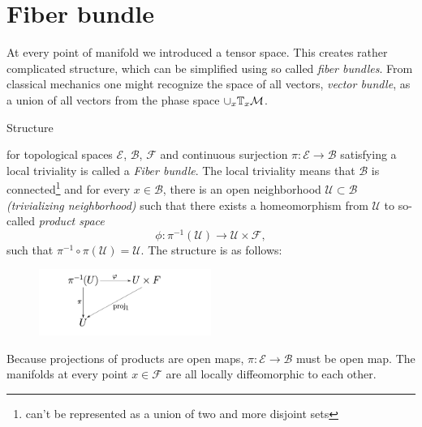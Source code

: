 \section{Fiber bundle}
\label{sec:bundleDef}
At every point of manifold we introduced a tensor space. This creates rather complicated structure, which can be simplified using so called \emph{fiber bundles}. From classical mechanics one might recognize the space of all vectors, \emph{vector bundle}, as a union of all vectors from the phase space $\cup_x\mathbb{T}_x\mathcal{M}$.
\begin{definition}
    \label{def:fiberBundle}
    Structure 
\begin{center}
\end{center}
    for topological spaces $\mathcal{E}$, $\mathcal{B}$, $\mathcal F$ and continuous surjection $\pi: \mathcal{E}\rightarrow \mathcal{B}$ satisfying a local triviality is called a \emph{Fiber bundle}. The local triviality means that $\mathcal{B}$ is connected\footnote{can't be represented as a union of two and more disjoint sets} and for every $x\in \mathcal{B}$, there is an open neighborhood $\mathcal{U}\subset \mathcal{B}$ \emph{(trivializing neighborhood)} such that there exists a homeomorphism from $\mathcal{U}$ to so-called \emph{product space}
    $$\phi: \pi^{-1}(\mathcal{U})\rightarrow \mathcal{U}\times \mathcal{F},$$
    such that $\pi^{-1}\circ \pi(\mathcal{U})=\mathcal{U}$.
    The structure is as follows: 
    \begin{figure}[H]
        \centering
        \includegraphics[width=0.5\textwidth]{../img/bundle.png}
        \caption{}
    \end{figure}
\end{definition}
Because projections of products are open maps, $\pi: \mathcal{E}\rightarrow \mathcal{B}$ must be open map. The manifolds at every point $x\in \mathcal{F}$ are all locally diffeomorphic to each other.
